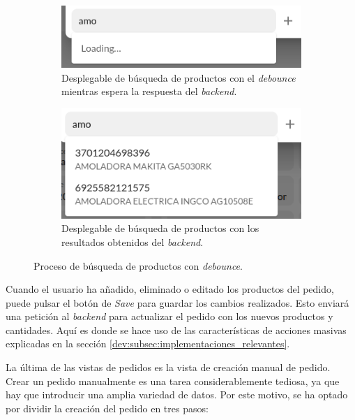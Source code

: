 \begin{figure}[H]
    \centering
    \begin{subfigure}{0.45\linewidth}
        \centering
        \includegraphics[width=\linewidth]{figures/design_develop/screenshots/busqueda_debounced_loading.png}
        \caption{Desplegable de búsqueda de productos con el \textit{debounce} mientras espera la respuesta del \textit{backend}.}
    \end{subfigure}
    \hfill
    \begin{subfigure}{0.45\linewidth}
        \centering
        \includegraphics[width=\linewidth]{figures/design_develop/screenshots/busqueda_debounced.png}
        \caption{Desplegable de búsqueda de productos con los resultados obtenidos del \textit{backend}.}
    \end{subfigure}
    \caption{Proceso de búsqueda de productos con \textit{debounce}.}
    \label{fig:dev:ss:busqueda_debounced}
\end{figure}

Cuando el usuario ha añadido, eliminado o editado los productos del pedido, puede pulsar el botón de \textit{Save} para guardar los cambios realizados. Esto enviará una petición al \textit{backend} para actualizar el pedido con los nuevos productos y cantidades. Aquí es donde se hace uso de las características de acciones masivas explicadas en la sección \ref{dev:subsec:implementaciones_relevantes}.

La última de las vistas de pedidos es la vista de creación manual de pedido. Crear un pedido manualmente es una tarea considerablemente tediosa, ya que hay que introducir una amplia variedad de datos. Por este motivo, se ha optado por dividir la creación del pedido en tres pasos:

